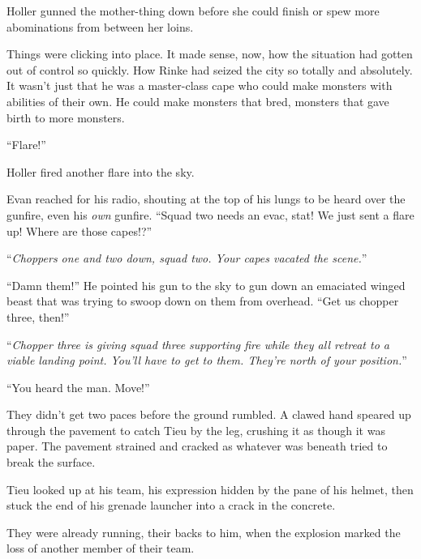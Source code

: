 Holler gunned the mother-thing down before she could finish or spew more abominations from between her loins.



Things were clicking into place.  It made sense, now, how the situation had gotten out of control so quickly.  How Rinke had seized the city so totally and absolutely.  It wasn't just that he was a master-class cape who could make monsters with abilities of their own.  He could make monsters that bred, monsters that gave birth to more monsters.



``Flare!''



Holler fired another flare into the sky.



Evan reached for his radio, shouting at the top of his lungs to be heard over the gunfire, even his \emph{own} gunfire.  ``Squad two needs an evac, stat!  We just sent a flare up!  Where are those capes!?''



``\emph{Choppers one and two down, squad two.  Your capes vacated the scene.}''



``Damn them!''  He pointed his gun to the sky to gun down an emaciated winged beast that was trying to swoop down on them from overhead.  ``Get us chopper three, then!''



``\emph{Chopper three is giving squad three supporting fire while they all retreat to a viable landing point.  You'll have to get to them.  They're north of your position.}''



``You heard the man.  Move!''



They didn't get two paces before the ground rumbled.  A clawed hand speared up through the pavement to catch Tieu by the leg, crushing it as though it was paper.  The pavement strained and cracked as whatever was beneath tried to break the surface.



Tieu looked up at his team, his expression hidden by the pane of his helmet, then stuck the end of his grenade launcher into a crack in the concrete.



They were already running, their backs to him, when the explosion marked the loss of another member of their team.



